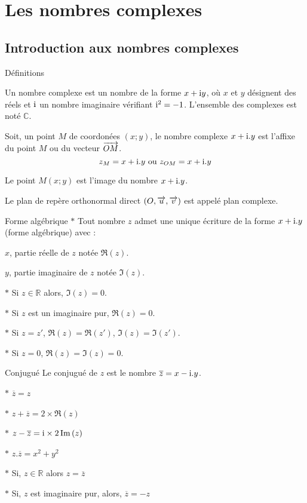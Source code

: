 \section{Les nombres complexes}
\subsection{Introduction aux nombres complexes}
\begin{bclogo}{Définitions}


Un nombre complexe est un nombre de la forme $x+\mathrm{i} y$, où $x$ et $y$ désignent des réels et $\mathrm{i} $ un nombre imaginaire vérifiant $\mathrm{i} ^2=-1$. L'ensemble des complexes est noté $\mathbb{C}$.

Soit, un point $M$ de coordonées $(x;y)$, le nombre complexe $x+\mathrm{i} .y$ est l'affixe du point $M$ ou du vecteur $\overrightarrow{OM}$. \[z_M=x+\mathrm{i} .y \text{ ou } z_{OM}=x+\mathrm{i} .y\]

Le point $M(x;y)$ est l'image du nombre $x+\mathrm{i} .y$.

Le plan de repère orthonormal direct $(O,\overrightarrow{u},\overrightarrow{v})$ est appelé plan complexe.
\end{bclogo}

\medskip

\begin{bclogo}{Forme algébrique}
$\ast$ Tout nombre $z$ admet une unique écriture de la forme $x+\mathrm{i} .y$ (forme algébrique) avec :

$x$, partie réelle de $z$ notée $\Re (z)$.

$y$, partie imaginaire de $z$ notée $\Im (z)$.

$\ast$ Si $z\in \mathbb{R}$ alors, $\Im (z)=0$.

$\ast$ Si $z$ est un imaginaire pur, $\Re (z)=0$.

$\ast$ Si $z=z'$, $\Re (z)=\Re (z')$, $\Im (z)=\Im (z')$.

$\ast$ Si $z=0$, $\Re (z)=\Im (z)=0$.
 
\end{bclogo}

\medskip

\begin{bclogo}{Conjugué}
Le conjugué de $z$ est le nombre $\overline{z}=x-\mathrm{i} .y$.

$\ast$ $\overline{z}=z$

$\ast$ $z+\overline{z}=2\times \Re (z)$

$\ast$ $z-\overline{z}=\mathrm{i} \times 2\,\mathrm{Im}\, (z)$

$\ast$ $z.\overline{z}=x^2+y^2$

$\ast$ Si, $z\in \mathbb{R}$ alors $z=\overline{z}$

$\ast$ Si, $z$ est imaginaire pur, alors, $\overline{z}=-z$
\end{bclogo}

